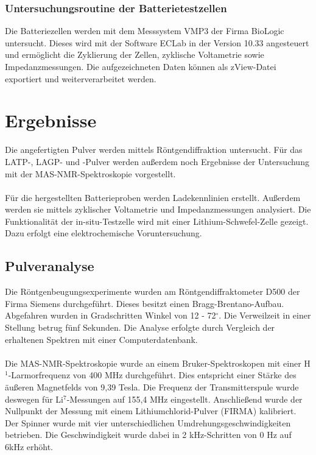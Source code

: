 \documentclass[a4paper, 11pt, headsepline,footsepline,twoside,abstract]{scrbook}
\begin{document}
\subsection{Untersuchungsroutine der Batterietestzellen} %
Die Batteriezellen werden mit dem Messsystem VMP3 der Firma BioLogic untersucht. Dieses wird mit der Software ECLab in der Version 10.33 angesteuert und ermöglicht die Zyklierung der Zellen, zyklische Voltametrie sowie Impedanzmessungen. Die aufgezeichneten Daten können als zView-Datei exportiert und weiterverarbeitet werden.


\chapter{Ergebnisse}
Die angefertigten Pulver werden mittels Röntgendiffraktion untersucht. Für das LATP-, LAGP- und -Pulver werden außerdem noch Ergebnisse der Untersuchung mit der MAS-NMR-Spektroskopie vorgestellt.
\\\\
Für die hergestellten Batterieproben werden Ladekennlinien erstellt. Außerdem werden sie mittels zyklischer Voltametrie und Impedanzmessungen analysiert. Die Funktionalität der in-situ-Testzelle wird mit einer Lithium-Schwefel-Zelle gezeigt. Dazu erfolgt eine elektrochemische Voruntersuchung.
\section{Pulveranalyse}
Die Röntgenbeugungsexperimente wurden am Röntgendiffraktometer D500 der Firma Siemens durchgeführt. Dieses besitzt einen Bragg-Brentano-Aufbau. Abgefahren wurden in Gradschritten Winkel von 12 - 72$^\circ$. Die Verweilzeit in einer Stellung betrug fünf Sekunden. Die Analyse erfolgte durch Vergleich der erhaltenen Spektren mit einer Computerdatenbank.
\\\\
Die MAS-NMR-Spektroskopie wurde an einem Bruker-Spektroskopen mit einer H$^1$-Larmor\-frequenz von 400 MHz durchgeführt. Dies entspricht einer Stärke des äußeren Magnetfelds von 9,39 Tesla. Die Frequenz der Transmitterspule wurde deswegen für Li$^7$-Messungen auf 155,4 MHz eingestellt. Anschließend wurde der Nullpunkt der Messung mit einem Lithiumchlorid-Pulver (FIRMA) kalibriert. Der Spinner wurde mit vier unterschiedlichen Umdrehungsgeschwindigkeiten betrieben. Die Geschwindigkeit wurde dabei in 2 kHz-Schritten von 0 Hz auf 6kHz erhöht.
\newpage
\end{document}
